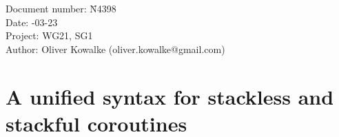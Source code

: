 \documentclass[paper=A4,pagesize,DIV=15]{scrartcl}
\begin{document}
\small
\begin{tabbing}
    Document number: \= N4398\\
    Date:            -03-23\\
    Project:         \> WG21, SG1\\
    Author:          \> Oliver Kowalke (oliver.kowalke@gmail.com)\\
\end{tabbing}

\section*{A unified syntax for stackless and stackful coroutines}


\tableofcontents













\end{document}
